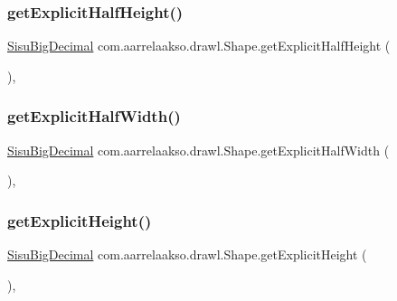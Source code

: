 \subsubsection{\texorpdfstring{get\+Explicit\+Half\+Height()}{getExplicitHalfHeight()}}
{\footnotesize\ttfamily \hyperlink{classcom_1_1aarrelaakso_1_1drawl_1_1_sisu_big_decimal}{Sisu\+Big\+Decimal} com.\+aarrelaakso.\+drawl.\+Shape.\+get\+Explicit\+Half\+Height (\begin{DoxyParamCaption}{ }\end{DoxyParamCaption})\hspace{0.3cm}{\ttfamily [protected]}, {\ttfamily [inherited]}}

\mbox{\label{classcom_1_1aarrelaakso_1_1drawl_1_1_shape_a4fba348eaeef3c258aa7443410137ad7}} 
\subsubsection{\texorpdfstring{get\+Explicit\+Half\+Width()}{getExplicitHalfWidth()}}
{\footnotesize\ttfamily \hyperlink{classcom_1_1aarrelaakso_1_1drawl_1_1_sisu_big_decimal}{Sisu\+Big\+Decimal} com.\+aarrelaakso.\+drawl.\+Shape.\+get\+Explicit\+Half\+Width (\begin{DoxyParamCaption}{ }\end{DoxyParamCaption})\hspace{0.3cm}{\ttfamily [protected]}, {\ttfamily [inherited]}}

\mbox{\label{classcom_1_1aarrelaakso_1_1drawl_1_1_shape_a0a263872f3a0bd19822415420e132a07}} 
\subsubsection{\texorpdfstring{get\+Explicit\+Height()}{getExplicitHeight()}}
{\footnotesize\ttfamily \hyperlink{classcom_1_1aarrelaakso_1_1drawl_1_1_sisu_big_decimal}{Sisu\+Big\+Decimal} com.\+aarrelaakso.\+drawl.\+Shape.\+get\+Explicit\+Height (\begin{DoxyParamCaption}{ }\end{DoxyParamCaption})\hspace{0.3cm}{\ttfamily [protected]}, {\ttfamily [inherited]}}

